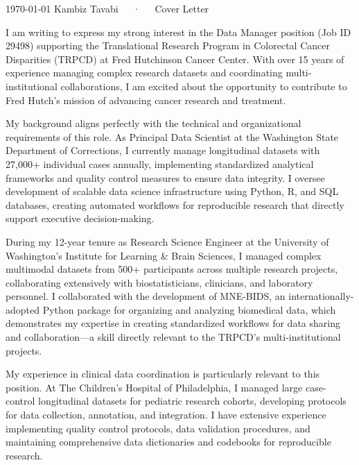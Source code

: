 \documentclass[10.5pt, letterpaper]{russell}
\begin{document}
\makecvheader[R]

\makecvfooter
{\today}
{Kambiz Tavabi~~~·~~~Cover Letter}
{\thepage}

\makelettertitle

\begin{cvletter}
  I am writing to express my strong interest in the Data Manager position (Job ID 29498) supporting the Translational Research Program in Colorectal Cancer Disparities (TRPCD) at Fred Hutchinson Cancer Center. With over 15 years of experience managing complex research datasets and coordinating multi-institutional collaborations, I am excited about the opportunity to contribute to Fred Hutch's mission of advancing cancer research and treatment.

  My background aligns perfectly with the technical and organizational requirements of this role. As Principal Data Scientist at the Washington State Department of Corrections, I currently manage longitudinal datasets with 27,000+ individual cases annually, implementing standardized analytical frameworks and quality control measures to ensure data integrity. I oversee development of scalable data science infrastructure using Python, R, and SQL databases, creating automated workflows for reproducible research that directly support executive decision-making.

  During my 12-year tenure as Research Science Engineer at the University of Washington's Institute for Learning \& Brain Sciences, I managed complex multimodal datasets from 500+ participants across multiple research projects, collaborating extensively with biostatisticians, clinicians, and laboratory personnel. I collaborated with the development of MNE-BIDS, an internationally-adopted Python package for organizing and analyzing biomedical data, which demonstrates my expertise in creating standardized workflows for data sharing and collaboration—a skill directly relevant to the TRPCD's multi-institutional projects.

  My experience in clinical data coordination is particularly relevant to this position. At The Children's Hospital of Philadelphia, I managed large case-control longitudinal datasets for pediatric research cohorts, developing protocols for data collection, annotation, and integration. I have extensive experience implementing quality control protocols, data validation procedures, and maintaining comprehensive data dictionaries and codebooks for reproducible research.


\end{cvletter}
\end{document}
